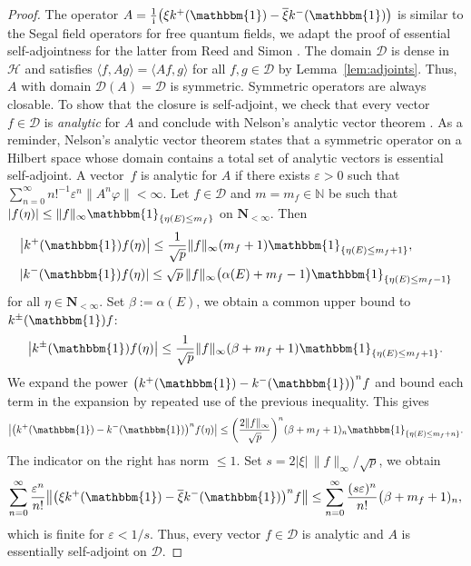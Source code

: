\documentclass[pdftex]{sigma}
\numberwithin{equation}{section}
\newcommand{\N}{\mathbb{N}}
\newcommand{\eps}{\varepsilon}
\newcommand{\la}{\langle}
\newcommand{\ra}{\rangle}
\newcommand{\1}{\mathbbm{1}}
\begin{document}
\begin{proof}
	The operator $A = \frac{1}{\mathrm i} \bigl( \xi k^+(\1)- \overline{\xi} k^-(\1)\bigr)$ is similar to the Segal field operators for free quantum fields, we adapt the proof of essential self-adjointness for the latter from Reed and Simon \cite[Theorem X.41\,(a)]{reedSimonII}.
	The domain $\mathcal D$ is dense in $\mathcal H$ and satisfies $\la f, A g\ra = \la Af, g\ra$ for all $f,g\in \mathcal D$ by Lemma~\ref{lem:adjoints}. Thus, $A$ with domain $\mathcal D(A) = \mathcal D$ is symmetric. Symmetric operators are always closable. 	
	To show that the closure is self-adjoint, we check that every vector $f\in \mathcal D$ is \emph{analytic} for $A$ and conclude with Nelson's analytic vector theorem \cite[Theorem~X.39]{reedSimonII}.
 As a reminder, Nelson's analytic vector theorem states that a symmetric operator on a Hilbert space whose domain contains a total set of analytic vectors is essential self-adjoint.
 A vector~$f$ is analytic for $A$ if there exists $\eps>0$ such that $\sum_{n=0}^\infty n!^{-1} \eps^n \| A^n \varphi\|<\infty$.
	Let $f\in \mathcal D$ and $m=m_f\in \N$ be such that $|f(\eta)|\leq \|f\|_\infty \1_{\{\eta(E)\leq m_f\}}$ on $\mathbf N_{<\infty}$. Then
	\begin{align*}
		&\bigl| k^+(\1) f(\eta)\bigr| \leq \frac{1}{\sqrt p} \|f\|_\infty (m_f+1) \1_{\{\eta(E) \leq m_f+1\}},\\
		&| k^-(\1) f(\eta)| \leq \sqrt p\, \|f\|_\infty \bigl(\alpha(E)+m_f-1\bigr) \1_{\{\eta(E) \leq m_f-1\}}
	\end{align*} 	
	for all $\eta \in \mathbf N_{<\infty}$. Set $\beta:= \alpha(E)$, we obtain a common upper bound to $k^\pm(\1) f$:
	\[
		\bigl| k^\pm(\1) f(\eta)\bigr| \leq \frac{1}{\sqrt p} \|f\|_\infty (\beta +m_f+1) \1_{\{\eta(E) \leq m_f + 1\}}.
	\]
	We expand the power $\bigl(k^+(\1) - k^-(\1)\bigr)^n f$ and bound each term in the expansion by repeated use of the previous inequality. This gives
	\[
		\bigl| \bigl(k^+(\1) - k^-(\1)\bigr)^n f(\eta)\bigr| \leq \biggl(\frac{ 2 \| f\|_\infty}{\sqrt p}\biggr)^{n} ( \beta + m_f + 1)_n \1_{\{\eta(E)\leq m_f+n\}}.
	\] 	
	The indicator on the right has norm $\leq 1$. Set $s = 2|\xi|\, \|f\|_\infty/\sqrt p$, we obtain
	\[
		\sum_{n=0}^\infty \frac{\eps^n}{n!} \bigl\| \bigl(\xi k^+(\1) -\overline{\xi} k^-(\1)\bigr)^n f \bigr\|
			 \leq \sum_{n=0}^\infty \frac{(s\eps)^n}{n!} \bigl(\beta + m_f + 1)_n,
	\] 	
	which is finite for $\eps< 1/s$. Thus, every vector $f\in \mathcal D$ is analytic and $A$ is essentially self-adjoint on $\mathcal D$. 		
\end{proof}
\end{document}
